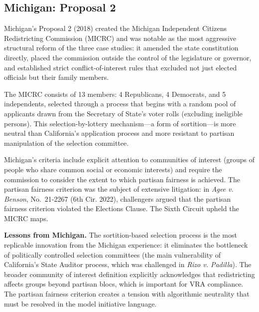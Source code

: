 \subsection{Michigan: Proposal 2}

Michigan's Proposal 2 (2018) created the Michigan Independent Citizens Redistricting Commission (MICRC) and was notable as the most aggressive structural reform of the three case studies: it amended the state constitution directly, placed the commission outside the control of the legislature or governor, and established strict conflict-of-interest rules that excluded not just elected officials but their family members.

The MICRC consists of 13 members: 4 Republicans, 4 Democrats, and 5 independents, selected through a process that begins with a random pool of applicants drawn from the Secretary of State's voter rolls (excluding ineligible persons). This selection-by-lottery mechanism---a form of sortition---is more neutral than California's application process and more resistant to partisan manipulation of the selection committee.

Michigan's criteria include explicit attention to communities of interest (groups of people who share common social or economic interests) and require the commission to consider the extent to which partisan fairness is achieved. The partisan fairness criterion was the subject of extensive litigation: in \textit{Agee v. Benson}, No.\ 21-2267 (6th Cir. 2022), challengers argued that the partisan fairness criterion violated the Elections Clause. The Sixth Circuit upheld the MICRC maps.

\textbf{Lessons from Michigan.} The sortition-based selection process is the most replicable innovation from the Michigan experience: it eliminates the bottleneck of politically controlled selection committees (the main vulnerability of California's State Auditor process, which was challenged in \textit{Rizo v. Padilla}). The broader community of interest definition explicitly acknowledges that redistricting affects groups beyond partisan blocs, which is important for VRA compliance. The partisan fairness criterion creates a tension with algorithmic neutrality that must be resolved in the model initiative language.
